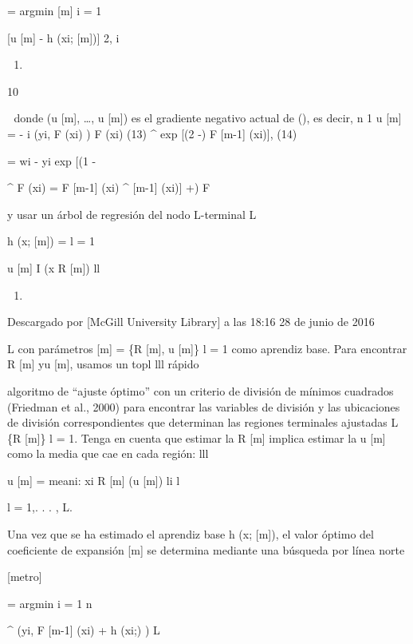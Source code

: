 \documentclass[]{article}
\begin{document}
= argmin {[}m{]} i = 1

{[}u {[}m{]} - h (xi; {[}m{]}){]} 2, i

\begin{enumerate}
\def\labelenumi{(\arabic{enumi})}
\setcounter{enumi}{11}
\item
\end{enumerate}

10

 donde (u {[}m{]}, \ldots{}, u {[}m{]}) es el gradiente negativo actual
de (\textbar{}), es decir, n 1 u {[}m{]} = - i (yi, F (xi) \textbar{}) F
(xi) (13) \^{} exp {[}(2 -) F {[}m-1{]} (xi){]}, (14)

= wi - yi exp {[}(1 -

\^{} F (xi) = F {[}m-1{]} (xi) \^{} {[}m-1{]} (xi){]} +) F

y usar un árbol de regresión del nodo L-terminal L

h (x; {[}m{]}) = l = 1

u {[}m{]} I (x R {[}m{]}) ll

\begin{enumerate}
\def\labelenumi{(\arabic{enumi})}
\setcounter{enumi}{14}
\item
\end{enumerate}

Descargado por {[}McGill University Library{]} a las 18:16 28 de junio
de 2016

L con parámetros {[}m{]} = \{R {[}m{]}, u {[}m{]}\} l = 1 como aprendiz
base. Para encontrar R {[}m{]} yu {[}m{]}, usamos un topl lll rápido

algoritmo de ``ajuste óptimo'' con un criterio de división de mínimos
cuadrados (Friedman et al., 2000) para encontrar las variables de
división y las ubicaciones de división correspondientes que determinan
las regiones terminales ajustadas L \{R {[}m{]}\} l = 1. Tenga en cuenta
que estimar la R {[}m{]} implica estimar la u {[}m{]} como la media que
cae en cada región: lll

u {[}m{]} = meani: xi R {[}m{]} (u {[}m{]}) li l

l = 1,. . . , L.

Una vez que se ha estimado el aprendiz base h (x; {[}m{]}), el valor
óptimo del coeficiente de expansión {[}m{]} se determina mediante una
búsqueda por línea norte

{[}metro{]}

= argmin i = 1 n

\^{} (yi, F {[}m-1{]} (xi) + h (xi;) \textbar{}) L
\end{document}

